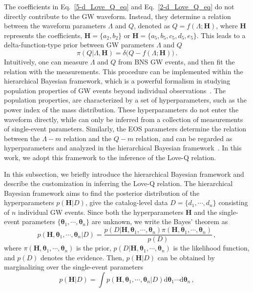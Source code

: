 \documentclass[a4paper,11pt]{article}
\begin{document}
The coefficients in Eq.~\eqref{5-d_Love_Q_eq} and Eq.~\eqref{2-d_Love_Q_eq} 
do not directly contribute to the GW waveform. Instead, they 
determine a relation between the waveform parameters
$\Lambda$ and $Q$, denoted as $Q=f(\Lambda;\bm{H})$, where $\bm{H}$ represents
the coefficients, $\bm{H} = \{a_2, b_2\}$ or $\bm{H} = \{a_5, b_5, c_5, d_5,
e_5\}$.
This leads to a delta-function-type prior between GW parameters $\Lambda$ and $Q$
\begin{equation}
\label{delta function prior}
\pi(Q|\Lambda,\bm{H}) = \delta\big(Q-f(\Lambda;\bm{H})\big)\,.
\end{equation}
Intuitively, one can measure $\Lambda$ and $Q$ from BNS GW events, and then fit
the relation with the measurements. This procedure can be implemented within the
hierarchical Bayesian framework, which is a powerful formalism in studying population
properties of GW events beyond individual observations~\cite{Thrane_2019}. The
population properties, 
are characterized by a set of hyperparameters, such as the power index of the
mass distribution. These hyperparameters do not enter the waveform directly,
while can only be inferred from a collection of measurements of single-event
parameters. Similarly, the EOS parameters determine the relation between the
$\Lambda-m$ relation and the $Q-m$ relation, and can be regarded as
hyperparameters and analyzed in the hierarchical Bayesian
framework~\cite{Mandel:2009nx,Mandel:2009pc,Adams:2012qw,Lackey:2014fwa,Mandel:2018mve,Golomb:2021tll,KAGRA:2021duu,Wang:2024xon}. In this work,
we adopt this framework to the inference of the Love-Q relation.


In this subsection, we briefly introduce the hierarchical Bayesian framework and
describe the customization in inferring the Love-Q relation.
The hierarchical Bayesian framework aims to
find the posterior distribution of the hyperparameters $p(\bm{H}|D)$, give the
catalog-level data $D=\{d_1,\cdots,d_n\}$ consisting of $n$ individual GW events.
Since both the hyperparameters $\bm{H}$ and the single-event parameters
$\{\bm{\theta}_1,\cdots,\bm{\theta}_n\}$ are unknown, we write the Bayes'
theorem as 
\begin{equation}
\label{bayes2}
p(\bm{H},\bm{\theta}_1,\cdots,\bm{\theta}_n|D)=\frac{p(D|\bm{H},\bm{\theta}_1,\cdots,\bm{\theta}_n)\pi(\bm{H},\bm{\theta}_1,\cdots,\bm{\theta}_n)}{p(D)}\,,
\end{equation}
where $\pi(\bm{H},\bm{\theta}_1,\cdots,\bm{\theta}_n)$ is the prior, $p(D|\bm{H},\bm{\theta}_1,\cdots,\bm{\theta}_n)$ 
is the likelihood function, and $p(D)$ denotes the evidence. Then, $p(\bm{H}|D)$
can be obtained by 
marginalizing over the single-event parameters
\begin{equation}
\label{bayes1}
p(\bm{H}|D) = \int p(\bm{H},\bm{\theta}_1,\cdots,\bm{\theta}_n|D) \text{d}\bm{\theta}_1\cdots\text{d}\bm{\theta}_n\,,
\end{equation}
\end{document}
